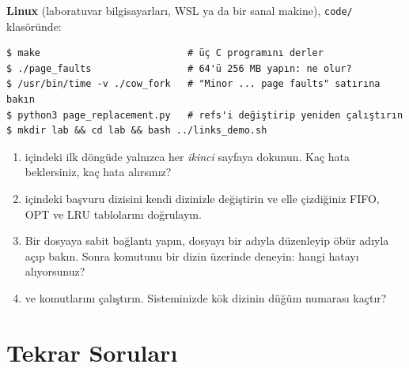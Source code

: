 \begin{tryit}
\textbf{Linux} (laboratuvar bilgisayarları, WSL ya da bir sanal makine), \texttt{code/} klasöründe:
\begin{lstlisting}[style=term]
$ make                          # üç C programını derler
$ ./page_faults                 # 64'ü 256 MB yapın: ne olur?
$ /usr/bin/time -v ./cow_fork   # "Minor ... page faults" satırına bakın
$ python3 page_replacement.py   # refs'i değiştirip yeniden çalıştırın
$ mkdir lab && cd lab && bash ../links_demo.sh
\end{lstlisting}
\begin{enumerate}[leftmargin=1.4em]
  \item {} içindeki ilk döngüde yalnızca her \emph{ikinci} sayfaya dokunun. Kaç hata beklersiniz, kaç hata alırsınız?
  \item {} içindeki başvuru dizisini kendi dizinizle değiştirin ve elle çizdiğiniz FIFO, OPT ve LRU tablolarını doğrulayın.
  \item Bir dosyaya sabit bağlantı yapın, dosyayı bir adıyla düzenleyip öbür adıyla açıp bakın. Sonra  komutunu bir dizin üzerinde deneyin: hangi hatayı alıyorsunuz?
  \item {} ve  komutlarını çalıştırın. Sisteminizde kök dizinin düğüm numarası kaçtır?
\end{enumerate}
\end{tryit}

\section{Tekrar Soruları}

